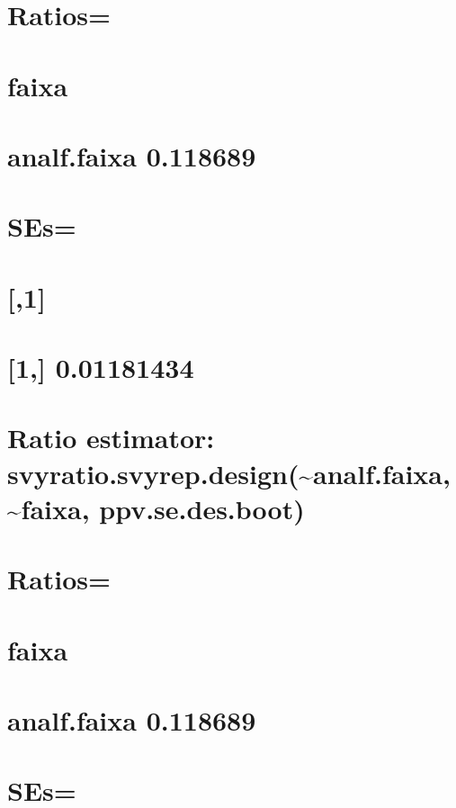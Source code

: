 \documentclass[]{book}
\theoremstyle{definition}
\theoremstyle{definition}
\theoremstyle{definition}
\theoremstyle{remark}
\begin{document}
\section{Ratios=}\label{ratios-3}

\section{faixa}\label{faixa-3}

\section{analf.faixa 0.118689}\label{analf.faixa-0.118689-1}

\section{SEs=}\label{ses-3}

\section{{[},1{]}}\label{section-10}

\section{{[}1,{]} 0.01181434}\label{section-11}

\section{Ratio estimator:
svyratio.svyrep.design(\textasciitilde{}analf.faixa,
\textasciitilde{}faixa,
ppv.se.des.boot)}\label{ratio-estimator-svyratio.svyrep.designanalf.faixa-faixa-ppv.se.des.boot}

\section{Ratios=}\label{ratios-4}

\section{faixa}\label{faixa-4}

\section{analf.faixa 0.118689}\label{analf.faixa-0.118689-2}

\section{SEs=}\label{ses-4}
\end{document}
